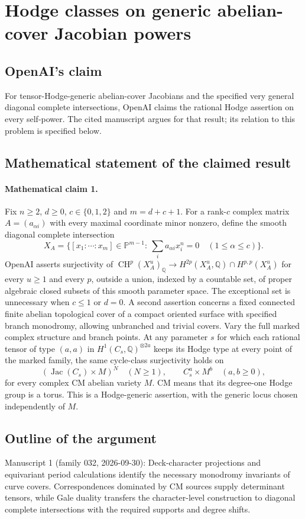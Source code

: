 \documentclass[11pt]{article}
\begin{document}
\section*{Hodge classes on generic abelian-cover Jacobian powers}

\subsection{OpenAI's claim}
For tensor-Hodge-generic abelian-cover Jacobians and the specified very general diagonal complete intersections, OpenAI claims the rational Hodge assertion on every self-power. The cited manuscript argues for that result; its relation to this problem is specified below.

\subsection{Mathematical statement of the claimed result}
\paragraph{Mathematical claim 1.} Fix $n\ge2$, $d\ge0$, $c\in\{0,1,2\}$ and $m=d+c+1$. For a rank-$c$ complex matrix $A=(a_{\alpha i})$ with every maximal coordinate minor nonzero, define the smooth diagonal complete intersection
\[
X_A=\{[x_1:\cdots:x_m]\in\mathbb P^{m-1}:\ \sum_i a_{\alpha i}x_i^n=0\quad(1\le\alpha\le c)\}.
\]
OpenAI asserts surjectivity of $\operatorname{CH}^p(X_A^u)_{\mathbb Q}\to H^{2p}(X_A^u,\mathbb Q)\cap H^{p,p}(X_A^u)$ for every $u\ge1$ and every $p$, outside a union, indexed by a countable set, of proper algebraic closed subsets of this smooth parameter space. The exceptional set is unnecessary when $c\le1$ or $d=0$.
A second assertion concerns a fixed connected finite abelian topological cover of a compact oriented surface with specified branch monodromy, allowing unbranched and trivial covers. Vary the full marked complex structure and branch points. At any parameter $s$ for which each rational tensor of type $(a,a)$ in $H^1(C_s,\mathbb Q)^{\otimes 2a}$ keeps its Hodge type at every point of the marked family, the same cycle-class surjectivity holds on
\[
(\operatorname{Jac}(C_s)\times M)^N\quad(N\ge1),\qquad C_s^a\times M^b\quad(a,b\ge0),
\]
for every complex CM abelian variety $M$. CM means that its degree-one Hodge group is a torus. This is a Hodge-generic assertion, with the generic locus chosen independently of $M$.

\subsection{Outline of the argument}
Manuscript 1 (family 032, 2026-09-30): Deck-character projections and equivariant period calculations identify the necessary monodromy invariants of curve covers. Correspondences dominated by CM sources supply determinant tensors, while Gale duality transfers the character-level construction to diagonal complete intersections with the required supports and degree shifts.
\end{document}
